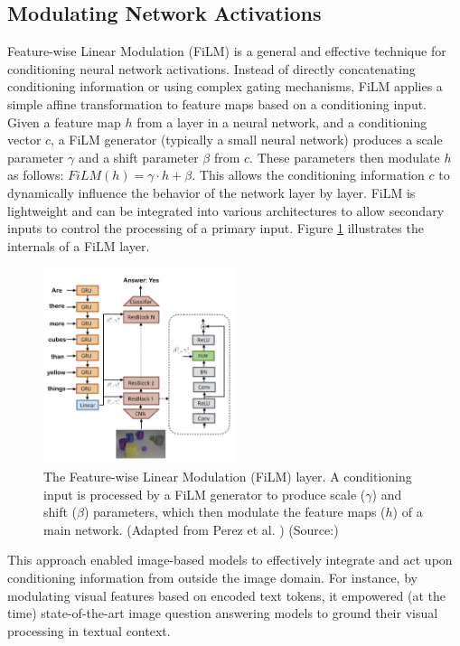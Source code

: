 \subsection{Modulating Network Activations}
Feature-wise Linear Modulation (FiLM) \cite{film} is a general and effective technique for conditioning neural network activations. Instead of directly concatenating conditioning information or using complex gating mechanisms, FiLM applies a simple affine transformation to feature maps based on a conditioning input. Given a feature map $h$ from a layer in a neural network, and a conditioning vector $c$, a FiLM generator (typically a small neural network) produces a scale parameter $\gamma$ and a shift parameter $\beta$ from $c$. These parameters then modulate $h$ as follows: $FiLM(h) = \gamma \cdot h + \beta$. This allows the conditioning information $c$ to dynamically influence the behavior of the network layer by layer. FiLM is lightweight and can be integrated into various architectures to allow secondary inputs to control the processing of a primary input. Figure \ref{fig:film-layer} illustrates the internals of a FiLM layer.

\begin{figure}[h]
  \centering
  \includegraphics[width=0.5\textwidth]{images/related-work/film.png}
  \caption{The Feature-wise Linear Modulation (FiLM) layer. A conditioning input is processed by a FiLM generator to produce scale ($\gamma$) and shift ($\beta$) parameters, which then modulate the feature maps ($h$) of a main network. (Adapted from Perez et al. \cite{film}) (Source:\cite{film})}
  \label{fig:film-layer}
\end{figure}

This approach enabled image-based models to effectively integrate and act upon conditioning information from outside the image domain. For instance, by modulating visual features based on encoded text tokens, it empowered (at the time) state-of-the-art image question answering models to ground their visual processing in textual context.

